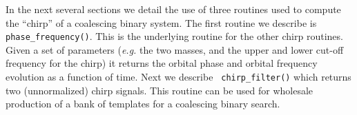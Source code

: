 In the next several sections we detail the use of three routines used
to compute the ``chirp'' of a coalescing binary system.  The first
routine we describe is {\tt phase\_frequency()}.  This is the
underlying routine for the other chirp routines.  Given a set of
parameters ({\it e.g.} the two masses, and the upper and lower cut-off
frequency for the chirp) it returns the orbital phase and orbital
frequency evolution as a function of time.  Next we describe {\tt
chirp\_filter()} which returns two (unnormalized) chirp signals.  This
routine can be used for wholesale production of a bank of templates for
a coalescing binary search.  

\clearpage

